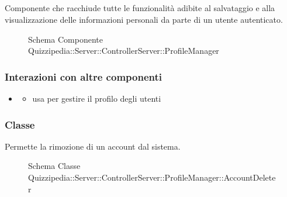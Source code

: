 \subsection{}
Componente che racchiude tutte le funzionalità adibite al salvataggio e alla visualizzazione delle informazioni personali da parte di un utente autenticato.
\begin{figure}[H]
\centering
\noindent{}
\caption[Schema Componente Quizzipedia::Server::ControllerServer::ProfileManager]{Schema Componente Quizzipedia::Server::ControllerServer::ProfileManager}
\end{figure}
\subsubsection{Interazioni con altre componenti}
\begin{itemize}
\item {}
\begin{itemize}
\item usa  per gestire il profilo degli utenti
\end{itemize}
\end{itemize}
\subsubsection{Classe }
Permette la rimozione di un account dal sistema.
\begin{figure}[H]
\centering
\noindent{}
\caption[Schema Classe AccountDeleter]{Schema Classe Quizzipedia::Server::ControllerServer::ProfileManager::AccountDeleter}
\end{figure}
